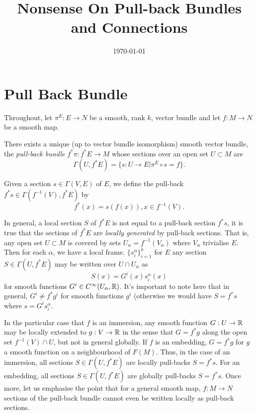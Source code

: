 \documentclass{amsart}
\begin{document}
\title[Pull-back Bundle Nonsense]
 {Nonsense On Pull-back Bundles and Connections}

\curraddr{}
\email{}
\date{\today}

\dedicatory{}
\subjclass[2010]{}
\keywords{}

\maketitle

\section{Pull Back Bundle}

Throughout, let \(\pi^E : E \to N\) be a smooth, rank \(k\), vector bundle and let \(f : M \to N\) be a smooth map.

\begin{lemma}
There exists a unique (up to vector bundle isomorphism) smooth vector bundle, the \emph{pull-back bundle} \(f^{\ast} \pi : f^{\ast}E \to M\) whose sections over an open set \(U  \subset M\) are
\[
\Gamma(U, f^{\ast} E) = \{s : U \to E | \pi^E \circ s = f\}.
\]
\end{lemma}

\begin{defn}
Given a section \(s \in \Gamma(V, E)\) of \(E\), we define the pull-back \(f^{\ast} s \in \Gamma(f^{-1}(V), f^{\ast} E)\) by
\[
f^{\ast} (x) = s(f(x)), x \in f^{-1}(V).
\]
\end{defn}

\begin{rem}
In general, a local section \(S\) of \(f^{\ast} E\) is not equal to a pull-back section \(f^{\ast} s\), it is true that the sections of \(f^{\ast} E\) are \emph{locally generated} by pull-back sections. That is, any open set \(U \subset M\) is covered by sets \(U_{\alpha} = f^{-1}(V_{\alpha})\) where \(V_{\alpha}\) trivialise \(E\). Then for each \(\alpha\), we have a local frame. \(\{s^{\alpha}_i\}_{i=1}^k\) for \(E\) any section \(S \in \Gamma(U, f^{\ast} E)\) may be written over \(U \cap U_{\alpha}\) as
\[
S(x) = G^i(x) s^{\alpha}_i(x)
\]
for smooth functions \(G^i \in C^{\infty}(U_{\alpha}, \mathbb{R})\). It's important to note here that in general, \(G^i \ne f^{\ast} g^i\) for smooth functions \(g^i\) (otherwise we would have \(S = f^{\ast} s\) where \(s = G^i s^{\alpha}_i\).

In the particular case that \(f\) is an immersion, any smooth function \(G : U \to \mathbb{R}\) may be locally extended to \(g : V \to \mathbb{R}\) in the sense that \(G = f^{\ast} g\) along the open set \(f^{-1}(V) \cap U\), but not in general globally. If \(f\) is an embedding, \(G = f^{\ast} g\) for \(g\) a smooth function on a neighbourhood of \(F(M)\). Thus, in the case of an immersion, all sections \(S \in \Gamma(U, f^{\ast} E)\) are locally pull-backs \(S = f^{\ast} s\). For an embedding, all sections \(S \in \Gamma(U, f^{\ast} E)\) are globally pull-backs \(S = f^{\ast} s\). Once more, let us emphasise the point that for a general smooth map, \(f: M \to N\) sections of the pull-back bundle cannot even be written locally as pull-back sections.
\end{rem}
\end{document}
